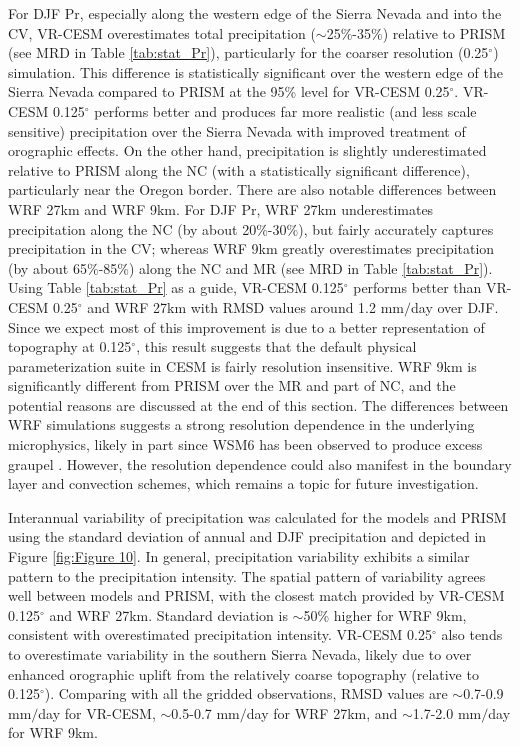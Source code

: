 For DJF Pr, especially along the western edge of the Sierra Nevada and into the CV, VR-CESM overestimates total precipitation ($\sim$25$\%$-35$\%$) relative to PRISM (see MRD in Table \ref{tab:stat_Pr}), particularly for the coarser resolution (0.25$^\circ$) simulation. This difference is statistically significant over the western edge of the Sierra Nevada compared to PRISM at the 95\% level for VR-CESM 0.25$^\circ$. VR-CESM 0.125$^\circ$ performs better and produces far more realistic (and less scale sensitive) precipitation over the Sierra Nevada with improved treatment of orographic effects. On the other hand, precipitation is slightly underestimated relative to PRISM along the NC (with a statistically significant difference), particularly near the Oregon border. There are also notable differences between WRF 27km and WRF 9km. For DJF Pr, WRF 27km underestimates precipitation along the NC (by about 20$\%$-30$\%$), but fairly accurately captures precipitation in the CV; whereas WRF 9km greatly overestimates precipitation (by about 65$\%$-85$\%$) along the NC and MR (see MRD in Table \ref{tab:stat_Pr}). Using Table \ref{tab:stat_Pr} as a guide, VR-CESM 0.125$^\circ$ performs  better than VR-CESM 0.25$^\circ$ and WRF 27km with RMSD values around 1.2 mm$/$day over DJF. Since we expect most of this improvement is due to a better representation of topography at 0.125$^\circ$, this result suggests that the default physical parameterization suite in CESM is fairly resolution insensitive. WRF 9km is significantly different from PRISM over the MR and part of NC, and the potential reasons are discussed at the end of this section. The differences between WRF simulations suggests a strong resolution dependence in the underlying microphysics, likely in part since WSM6 has been observed to produce excess graupel \cite{jankov2009evaluation}. However, the resolution dependence could also manifest in the boundary layer and convection schemes, which remains a topic for future investigation.

Interannual variability of precipitation was calculated for the models and PRISM using the standard deviation of annual and DJF precipitation and depicted in Figure \ref{fig:Figure 10}. In general, precipitation variability exhibits a similar pattern to the precipitation intensity. The spatial pattern of variability agrees well between models and PRISM, with the closest match provided by VR-CESM 0.125$^\circ$ and WRF 27km. Standard deviation is $\sim$50$\%$ higher for WRF 9km, consistent with overestimated precipitation intensity. VR-CESM 0.25$^\circ$ also tends to overestimate variability in the southern Sierra Nevada, likely due to over enhanced orographic uplift from the relatively coarse topography (relative to 0.125$^\circ$). Comparing with all the gridded observations, RMSD values are $\sim$0.7-0.9 mm$/$day for VR-CESM, $\sim$0.5-0.7 mm$/$day for WRF 27km, and $\sim$1.7-2.0 mm$/$day for WRF 9km.

